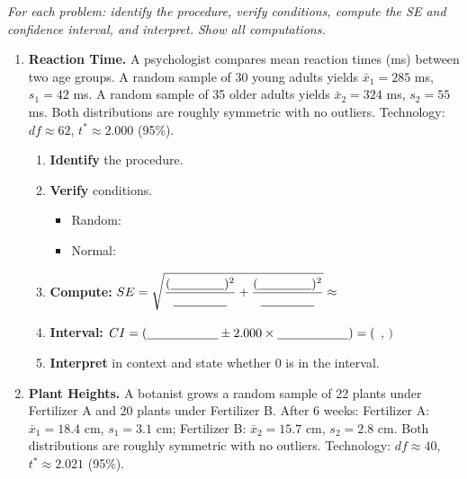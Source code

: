 \documentclass[10pt]{article}
\begin{document}
\namedateperiod

\vspace{0.15in}

\textit{For each problem: identify the procedure, verify conditions, compute the SE and
confidence interval, and interpret. Show all computations.}

\begin{enumerate}

\item \textbf{Reaction Time.} \quad
A psychologist compares mean reaction times (ms) between two age groups. A random sample
of 30 young adults yields $\bar x_1 = 285$ ms, $s_1 = 42$ ms. A random sample of 35 older
adults yields $\bar x_2 = 324$ ms, $s_2 = 55$ ms. Both distributions are roughly symmetric
with no outliers. Technology: $df \approx 62$, $t^* \approx 2.000$ (95\%).

\begin{enumerate}[label=\alph*.]
  \item \textbf{Identify} the procedure.  \blank{8cm}
  \item \textbf{Verify} conditions.
        \begin{itemize}
          \item Random: \writeline
          \item Normal: \writeline
        \end{itemize}
  \item \textbf{Compute:} $SE = \sqrt{\dfrac{(\blank{1.5cm})^2}{\blank{1.5cm}} + \dfrac{(\blank{1.5cm})^2}{\blank{1.5cm}}} \approx$ \blank{2.5cm}
  \item \textbf{Interval:} $CI = (\blank{2cm} \pm 2.000 \times \blank{2cm}) = ($ \blank{3cm}, \blank{3cm} $)$
  \item \textbf{Interpret} in context and state whether 0 is in the interval.
\end{enumerate}

\vspace{0.06in}

\item \textbf{Plant Heights.} \quad
A botanist grows a random sample of 22 plants under Fertilizer A and 20 plants under
Fertilizer B. After 6 weeks: Fertilizer A: $\bar x_1 = 18.4$ cm, $s_1 = 3.1$ cm;
Fertilizer B: $\bar x_2 = 15.7$ cm, $s_2 = 2.8$ cm.
Both distributions are roughly symmetric with no outliers. Technology: $df \approx 40$,
$t^* \approx 2.021$ (95\%).


\end{enumerate}
\end{document}
